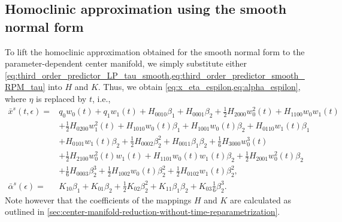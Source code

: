 \subsection{Homoclinic approximation using the smooth normal form}
To lift the homoclinic approximation obtained for the smooth normal form to the
parameter-dependent center manifold, we simply substitute either
\cref{eq:third_order_predictor_LP_tau_smooth,eq:third_order_predictor_smooth_RPM_tau}
into $H$ and $K$. Thus, we obtain \cref{eq:x_eta_espilon,eq:alpha_espilon}, where
$\eta$ is replaced by $t$, i.e., 
\begin{align*}
\bar x^s(t, \epsilon)={}& q_0w_0(t) + q_1w_1(t) + H_{0010}\beta_1 + H_{0001} \beta_2 
+ \frac12 H_{2000}w_0^2(t) + H_{1100}w_0w_1(t) \\
                         & + \frac12 H_{0200}w_1^2(t) + H_{1010}w_0(t)\beta_1 + H_{1001}w_0(t)\beta_2 + H_{0110}w_1(t)\beta_1 \nonumber \\
                         & + H_{0101}w_1(t)\beta_2 + \frac12 H_{0002}\beta_2^2+ H_{0011}\beta_1\beta_2 + \frac16 H_{3000}w_0^3(t) \nonumber \\
                         & + \frac12 H_{2100}w_0^2(t)w_1(t) + H_{1101}w_0(t)w_1(t)\beta_2 + \frac12 H_{2001}w_0^2(t)\beta_2 \nonumber \\
                         & + \frac{1}{6}H_{0003}\beta_2^3 + \frac12 H_{1002}w_0(t)\beta_2^2 + \frac12 H_{0102}w_1(t)\beta_2^2, \nonumber \\
\bar \alpha^s(\epsilon) ={}& K_{10}\beta_1 + K_{01}\beta_2 + \frac{1}{2}K_{02}\beta_2^{2} + K_{11}\beta_1\beta_2 + K_{03} \frac16 \beta_2^3.
\end{align*}
Note however that the coefficients of the mappings $H$ and $K$ are calculated
as outlined in
\cref{sec:center-manifold-reduction-without-time-reparametrization}.

\ifthesis
